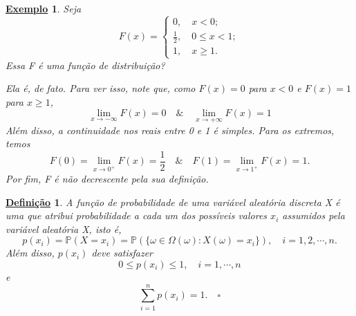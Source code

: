 \documentclass{article}
\newtheorem*{def*}{\underline{Defini\c c\~ao}}
\newtheorem{example}{\underline{Exemplo}}
\begin{document}
\begin{example}
  Seja 
  \[
    F(x)  = \left\{\begin{array}{ll}
        0,\quad x < 0;\\
        \frac{1}{2},\quad 0\leq x < 1;\\
        1,\quad x\geq 1.
    \end{array}\right.
  \]
  Essa F é uma função de distribuição?

  Ela é, de fato. Para ver isso, note que, como \(F(x) = 0\) para \(x < 0\) e \(F(x) = 1\) para 
  \(x\geq 1\),
  \[
    \lim_{x\to -\infty} F(x) = 0\quad\&\quad \lim_{x\to +\infty}F(x) = 1
  \]
  Além disso, a continuidade nos reais entre 0 e 1 é simples. Para os extremos, temos 
  \[
    F(0) = \lim_{x\to 0^{+}}F(x) = \frac{1}{2}\quad\&\quad F(1) = \lim_{x\to 1^{+}}F(x) = 1.
  \]
  Por fim, F é não decrescente pela sua definição.  
\end{example}
\begin{def*}
  A função de probabilidade de uma variável aleatória discreta X é uma que atribui probabilidade
  a cada um dos possíveis valores \(x_{i}\) assumidos pela variável aleatória X, isto é, 
  \[
    p(x_{i}) = \mathbb{P}(X = x_{i}) = \mathbb{P}(\{\omega \in \Omega (\omega ): X(\omega ) = x_{i}\}),\quad i = 1, 2, \cdots, n.
  \]
  Além disso, \(p(x_{i})\) deve satisfazer 
  \[
    0\leq p(x_{i})\leq 1,\quad i = 1, \cdots, n
  \]
  e 
  \[
    \sum\limits_{i=1}^{n}p(x_{i}) = 1.\quad \square
  \]
\end{def*}
\end{document}
